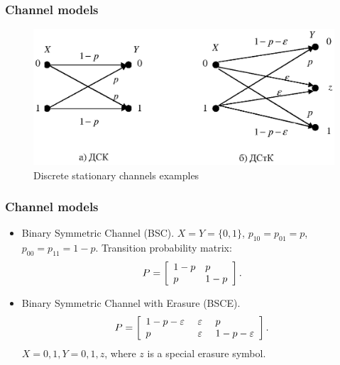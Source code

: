 \documentclass[14pt]{beamer}
\begin{document}
\begin{frame}
\frametitle{Channel models}
\begin{itemize}

\begin{figure}[ht]
\begin{minipage}{1.0\linewidth}
\includegraphics[width=1.0\textwidth]{fig5_2.eps}
\caption{Discrete stationary channels examples} \label{fig5_2}
\end{minipage}
\end{figure}

\end{itemize}
\end{frame}

\begin{frame}
\frametitle{Channel models}
\begin{itemize}
    \item Binary Symmetric Channel (BSC).
        $X = Y = \{0,1\}$,
        $p_{10} = p_{01} = p$, $p_{00} = p_{11} = 1 - p$. 
        Transition probability matrix: 
        \[
        P = \left[ {{\begin{array}{*{20}c}
         {1 - p} \hfill & p \hfill \\
         p \hfill & {1 - p} \hfill \\
        \end{array} }} \right].
        \]

    \pause \item
    Binary Symmetric Channel with Erasure (BSCE). 
    \[
    P = \left[ {{\begin{array}{*{20}c}
     {1 - p - \varepsilon } \hfill \\
     p \hfill \\
    \end{array} }\mbox{ }{\begin{array}{*{20}c}
     \varepsilon \hfill \\
     \varepsilon \hfill \\
    \end{array} }\mbox{ }{\begin{array}{*{20}c}
     p \hfill \\
     {1 - p - \varepsilon } \hfill \\
    \end{array} }} \right].
    \]
    $X = {0,1}, Y = {0, 1, z}$, where $z$ is a special erasure symbol.    
    
\end{itemize}
\end{frame}
\end{document}
